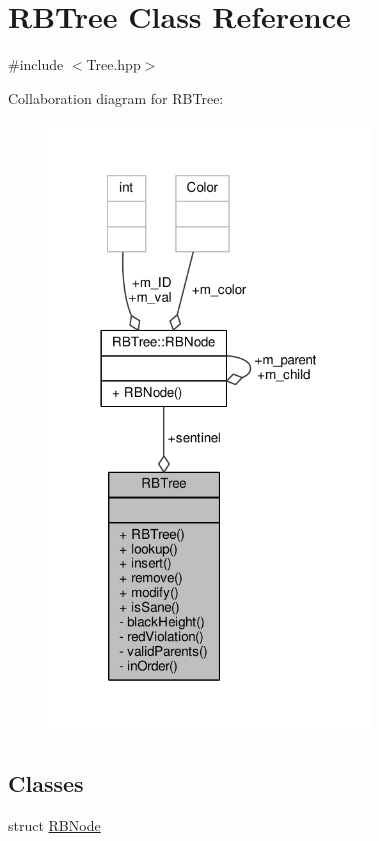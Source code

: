 \hypertarget{classRBTree}{\section{R\-B\-Tree Class Reference}
\label{classRBTree}
}


{\ttfamily \#include $<$Tree.\-hpp$>$}



Collaboration diagram for R\-B\-Tree\-:
\nopagebreak
\begin{figure}[H]
\begin{center}
\leavevmode
\includegraphics[width=242pt]{classRBTree__coll__graph}
\end{center}
\end{figure}
\subsection*{Classes}
\begin{DoxyCompactItemize}
\item 
struct \hyperlink{structRBTree_1_1RBNode}{R\-B\-Node}
\end{DoxyCompactItemize}
